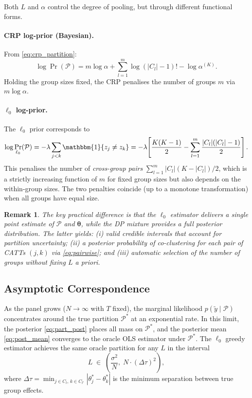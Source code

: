\documentclass[12pt]{article}
\newtheorem{remark}{Remark}
\newcommand{\1}{\mathbbm{1}}
\newcommand{\ytd}{\tilde{y}}
\begin{document}
Both $L$ and $\alpha$ control the degree of pooling, but through different
functional forms.

\paragraph{CRP log-prior (Bayesian).}
From \eqref{eq:crp_partition}:
\begin{equation}
  \log\Pr(\mathcal{P}) = m\log\alpha + \sum_{l=1}^{m}\log(|C_l|-1)! - \log\alpha^{(K)}.
\end{equation}
Holding the group sizes fixed, the CRP penalises the number of groups $m$ via
$m\log\alpha$.

\paragraph{$\ell_0$ log-prior.}
The $\ell_0$ prior corresponds to
\begin{equation}
  \log\Pr_{\ell_0}(\mathcal{P}) = -\lambda\sum_{j<k}\1\{z_j\neq z_k\}
    = -\lambda\!\left[\frac{K(K-1)}{2} - \sum_{l=1}^{m}\frac{|C_l|(|C_l|-1)}{2}\right].
\end{equation}
This penalises the number of \emph{cross-group pairs} $\sum_{l=1}^m|C_l|(K-|C_l|)/2$,
which is a strictly increasing function of $m$ for fixed group sizes but also
depends on the within-group sizes. The two penalties coincide (up to a monotone
transformation) when all groups have equal size.

\begin{remark}
  The key practical difference is that the $\ell_0$ estimator delivers a
  single point estimate of $\mathcal{P}$ and $\bm{\theta}$, while the DP
  mixture provides a full posterior distribution. The latter yields:
  (i) valid credible intervals that account for partition uncertainty;
  (ii) a posterior probability of co-clustering for each pair of CATTs
  $(j,k)$ via \eqref{eq:pairwise}; and (iii) automatic selection of the
  number of groups without fixing $L$ a priori.
\end{remark}

\subsection{Asymptotic Correspondence}

As the panel grows ($N\to\infty$ with $T$ fixed), the marginal likelihood
$p(\ytd\mid\mathcal{P})$ concentrates around the true partition $\mathcal{P}^*$
at an exponential rate. In this limit, the posterior \eqref{eq:part_post}
places all mass on $\mathcal{P}^*$, and the posterior mean \eqref{eq:post_mean}
converges to the oracle OLS estimator under $\mathcal{P}^*$. The $\ell_0$
greedy estimator achieves the same oracle partition for any $L$ in the interval
\begin{equation}
  L \;\in\; \left(\frac{\sigma^2}{N},\; N\cdot(\Delta\tau)^2\right),
\end{equation}
where $\Delta\tau = \min_{j\in C_l,\,k\in C_{l'}}\!|\theta_j^* - \theta_k^*|$
is the minimum separation between true group effects.
\end{document}
